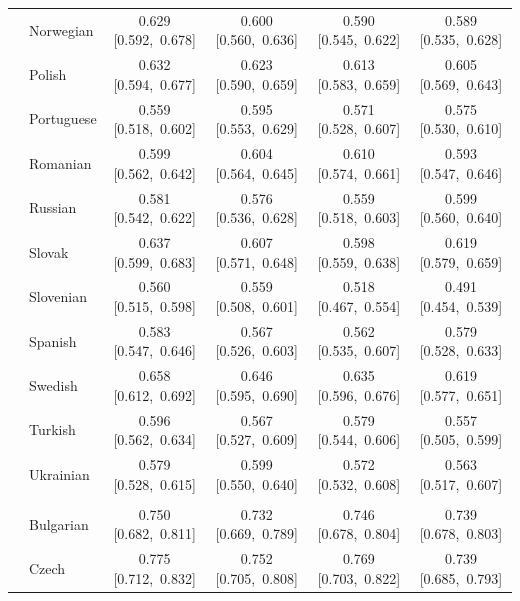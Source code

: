\begin{longtable}[t]{llcccc}
 & Norwegian & 0.629 [0.592,~0.678] & 0.600 [0.560,~0.636] & 0.590 [0.545,~0.622] & 0.589 [0.535,~0.628]\\

 & Polish & 0.632 [0.594,~0.677] & 0.623 [0.590,~0.659] & 0.613 [0.583,~0.659] & 0.605 [0.569,~0.643]\\

 & Portuguese & 0.559 [0.518,~0.602] & 0.595 [0.553,~0.629] & 0.571 [0.528,~0.607] & 0.575 [0.530,~0.610]\\

 & Romanian & 0.599 [0.562,~0.642] & 0.604 [0.564,~0.645] & 0.610 [0.574,~0.661] & 0.593 [0.547,~0.646]\\

 & Russian & 0.581 [0.542,~0.622] & 0.576 [0.536,~0.628] & 0.559 [0.518,~0.603] & 0.599 [0.560,~0.640]\\

 & Slovak & 0.637 [0.599,~0.683] & 0.607 [0.571,~0.648] & 0.598 [0.559,~0.638] & 0.619 [0.579,~0.659]\\

 & Slovenian & 0.560 [0.515,~0.598] & 0.559 [0.508,~0.601] & 0.518 [0.467,~0.554] & 0.491 [0.454,~0.539]\\

 & Spanish & 0.583 [0.547,~0.646] & 0.567 [0.526,~0.603] & 0.562 [0.535,~0.607] & 0.579 [0.528,~0.633]\\

 & Swedish & 0.658 [0.612,~0.692] & 0.646 [0.595,~0.690] & 0.635 [0.596,~0.676] & 0.619 [0.577,~0.651]\\

 & Turkish & 0.596 [0.562,~0.634] & 0.567 [0.527,~0.609] & 0.579 [0.544,~0.606] & 0.557 [0.505,~0.599]\\

 & Ukrainian & 0.579 [0.528,~0.615] & 0.599 [0.550,~0.640] & 0.572 [0.532,~0.608] & 0.563 [0.517,~0.607]\\

\addlinespace[3pt]
\multicolumn{6}{p{\linewidth}}{\cellcolor[HTML]{DCDCDC}{classify the stance expressed in quasi-sentence \(binary)}}\\
\addlinespace & Bulgarian & 0.750 [0.682,~0.811] & 0.732 [0.669,~0.789] & 0.746 [0.678,~0.804] & 0.739 [0.678,~0.803]\\

 & Czech & 0.775 [0.712,~0.832] & 0.752 [0.705,~0.808] & 0.769 [0.703,~0.822] & 0.739 [0.685,~0.793]\\


\end{longtable}
